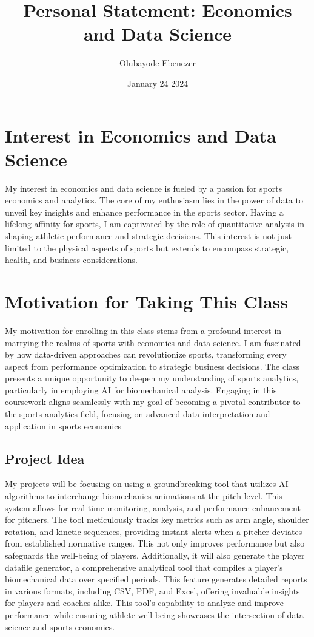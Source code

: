 \documentclass[10pt]{article}
\title{Personal Statement: Economics and Data Science}
\author{Olubayode Ebenezer}
\date{January 24 2024}
\begin{document}
\maketitle


\section{Interest in Economics and Data Science}

My interest in economics and data science is fueled by a passion for sports economics and analytics. The core of my enthusiasm lies in the power of data to unveil key insights and enhance performance in the sports sector. Having a lifelong affinity for sports, I am captivated by the role of quantitative analysis in shaping athletic performance and strategic decisions. This interest is not just limited to the physical aspects of sports but extends to encompass strategic, health, and business considerations.

\section{ Motivation for Taking This Class}

My motivation for enrolling in this class stems from a profound interest in marrying the realms of sports with economics and data science. I am fascinated by how data-driven approaches can revolutionize sports, transforming every aspect from performance optimization to strategic business decisions. The class presents a unique opportunity to deepen my understanding of sports analytics, particularly in employing AI for biomechanical analysis. Engaging in this coursework aligns seamlessly with my goal of becoming a pivotal contributor to the sports analytics field, focusing on advanced data interpretation and application in sports economics

\subsection{Project Idea}

My projects will be focusing  on using a groundbreaking tool that utilizes AI algorithms to interchange biomechanics animations at the pitch level. This system allows for real-time monitoring, analysis, and performance enhancement for pitchers. The tool meticulously tracks key metrics such as arm angle, shoulder rotation, and kinetic sequences, providing instant alerts when a pitcher deviates from established normative ranges. This not only improves performance but also safeguards the well-being of players. Additionally, it will also generate the player datafile generator, a comprehensive analytical tool that compiles a player's biomechanical data over specified periods. This feature generates detailed reports in various formats, including CSV, PDF, and Excel, offering invaluable insights for players and coaches alike. This tool's capability to analyze and improve performance while ensuring athlete well-being showcases the intersection of data science and sports economics.
\end{document}
